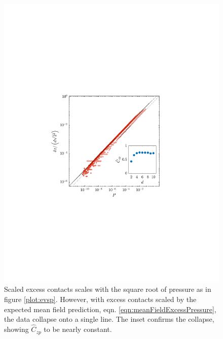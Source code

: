  \vspace{0.2cm}
  
\begin{figure}[h!]
    \includegraphics[width=\columnwidth, trim=133 242 168 254, clip]{excessContactsScaling/evspcomp.pdf}
   \caption{Scaled excess contacts scales with the square root of pressure as in figure \ref{plot:evsp}. 
    However, with excess contacts scaled by the expected mean field prediction, eqn. \ref{eqn:meanFieldExcessPressure},
    the data collapse onto a single line. The inset confirms the collapse, showing $\hat{C}_{zp}$ to be nearly constant.}
     \label{plot:evspcomp}
\end{figure}
